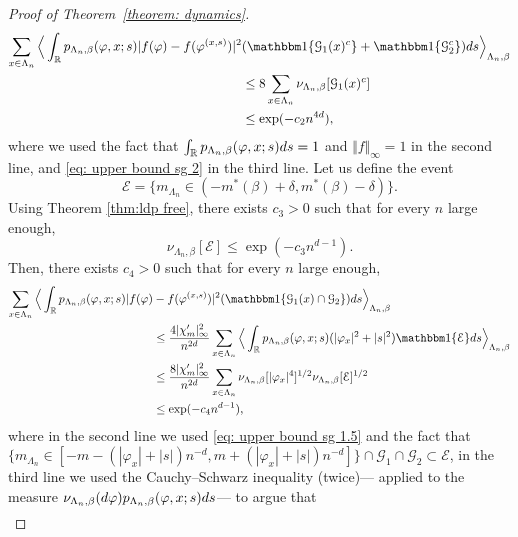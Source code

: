 \documentclass[11pt,a4paper]{article}
\theoremstyle{definition}
\numberwithin{equation}{section}
\begin{document}
\begin{proof}[Proof of Theorem~\textup{\ref{theorem: dynamics}}]
\begin{align}
\sum_{x \in \Lambda_n}\Big\langle \int_{\mathbb R} p_{\Lambda_n,\beta}(\varphi,x;s) |f(\varphi)-f(\varphi^{(x,s)})|^2 &(\mathbbm 1\{ \mathcal{G}_1(x)^c \} + \mathbbm 1\{ \mathcal{G}_2^c\}){\rm d}s  \Big\rangle_{\Lambda_n,\beta} 
\\&\leq 8 \sum_{x\in \Lambda_n}\nu_{\Lambda_n,\beta}[\mathcal{G}_1(x)^c]\\&\leq\exp(-c_2 n^{4d}),\label{eq: upper bound sg 2.5}
\end{align}
where we used the fact that $\int_{\mathbb R}p_{\Lambda_n,\beta}(\varphi,x;s){\rm d}s=1$ and $\Vert f\Vert_\infty=1$ in the second line, and \eqref{eq: upper bound sg 2} in the third line.
Let us define the event
\begin{equation}
\mathcal{E} = \{ m_{\Lambda_n} \in (-m^*(\beta)+\delta, m^*(\beta)-\delta) \}.
\end{equation}
Using Theorem \ref{thm:ldp free}, there exists $c_3>0$ such that for every $n$ large enough,
\begin{equation}\label{eq: upper bound sg 3}
\nu_{\Lambda_n,\beta}[\mathcal{E}] \leq \exp(-c_3 n^{d-1}).
\end{equation}
Then, there exists $c_4>0$ such that for every $n$ large enough,
\begin{align}
\sum_{x \in \Lambda_n}\Big\langle \int_{\mathbb R} p_{\Lambda_n,\beta}(\varphi,x;s) |f(\varphi)&-f(\varphi^{(x,s)})|^2 (\mathbbm 1\{ \mathcal{G}_1(x) \cap \mathcal{G}_2 \}){\rm d}s  \Big\rangle_{\Lambda_n,\beta} 
\\&\leq \frac{4|\chi_m'|_\infty^2}{n^{2d}}\sum_{x \in \Lambda_n}\Big\langle \int_{\mathbb R} p_{\Lambda_n,\beta}(\varphi,x;s)(|\varphi_x|^2+|s|^2) \mathbbm 1\{\mathcal{E}\}{\rm d}s  \Big\rangle_{\Lambda_n,\beta}
\\&\leq \frac{8|\chi_m'|_\infty^2}{n^{2d}}\sum_{x\in \Lambda_n}\nu_{\Lambda_n,\beta}[|\varphi_x|^4]^{1/2}\nu_{\Lambda_n,\beta}[\mathcal{E}]^{1/2}
\\&\leq \exp(-c_4 n^{d-1}),\label{eq: upper bound sg 4}
\end{align}
where in the second line we used \eqref{eq: upper bound sg 1.5} and the fact that $\{ m_{\Lambda_n} \in [-m-(|\varphi_x|+|s|)n^{-d},m+(|\varphi_x|+|s|)n^{-d}] \}\cap \mathcal{G}_1\cap \mathcal{G}_2\subset \mathcal{E}$, in the third line we used the Cauchy--Schwarz inequality (twice)--- applied to the measure $\nu_{\Lambda_n,\beta}({\rm d}\varphi)p_{\Lambda_n,\beta}(\varphi,x;s){\rm d}s$--- to argue that 
\begin{align}

\end{align}
\end{proof}
\end{document}
